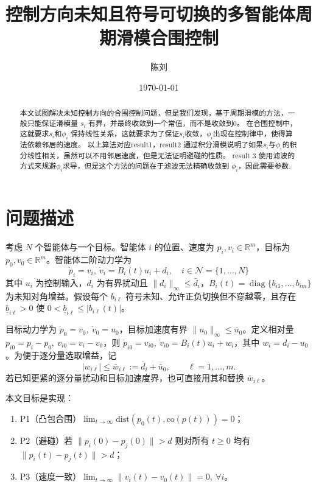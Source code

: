 \documentclass[12pt,a4paper]{article}
\title{控制方向未知且符号可切换的多智能体周期滑模合围控制}
\author{陈\quad 刘}
\date{\today}
\newcommand{\ub}{\underline{b}}
\newcommand{\bd}{\bar{d}}
\newcommand{\bu}{\bar{u}}
\begin{document}
\maketitle


\begin{abstract}
    本文试图解决未知控制方向的合围控制问题，但是我们发现，基于周期滑模的方法，一般只能保证滑模量 ${s}_i$ 有界，并最终收敛到一个常值，而不是收敛到$0$。
    在合围控制中，这就要求$s_i$和$\phi_i$ 保持线性关系，这就要求为了保证$s_i$收敛，$\dot{\phi}_i$出现在控制律中，使得算法依赖邻居的速度。
    以上算法对应result1，result2 通过积分滑模说明了如果${s}_i$与$\phi_i$的积分线性相关，虽然可以不用邻居速度，但是无法证明避碰的性质。
    result 3 使用滤波的方式来规避$\phi_i$求导，但是这个方法的问题在于滤波无法精确收敛到 $\dot{\phi}_i$，因此需要参数.
\end{abstract}

\section{问题描述}

考虑 $N$ 个智能体与一个目标。智能体 $i$ 的位置、速度为 $p_i,v_i\in\mathbb R^m$，目标为 $p_0,v_0\in\mathbb R^m$。智能体二阶动力学为  \[
\dot p_i=v_i,\ \dot v_i=B_i(t)u_i+d_i, \quad i \in \mathcal{N}=\{1,\dots,N\}
\]
其中 $u_i$ 为控制输入，$d_i$ 为有界扰动且 $\|d_i\|_\infty\le\bd_i$，$B_i(t)=\operatorname{diag}\{b_{i1},\dots,b_{im}\}$ 为未知对角增益。假设每个 $b_{i\ell}$ 符号未知、允许正负切换但不穿越零，且存在 $\ub_{i\ell}>0$ 使 $0<\ub_{i\ell}\le|b_{i\ell}(t)|$。

目标动力学为 $\dot p_0=v_0,\ \dot v_0=u_0$，目标加速度有界 $\|u_0\|_\infty\le\bu_0$。定义相对量 $p_{i0}=p_i-p_0,\ v_{i0}=v_i-v_0$，则 $\dot p_{i0}=v_{i0},\ \dot v_{i0}=B_i(t)u_i+w_i$，其中 $w_i=d_i-u_0$。为便于逐分量选取增益，记
\[
    |w_{i\ell}|\le\bar w_{i\ell}:=\bd_i+\bu_0,\qquad \ell=1,\dots,m.
\]
若已知更紧的逐分量扰动和目标加速度界，也可直接用其和替换 $\bar w_{i\ell}$。

本文目标是实现：
\begin{enumerate}
    \item P1（凸包合围）$\lim_{t\to\infty}\mathrm{dist}(p_0(t),\mathrm{co}(p(t)))=0$；
    \item P2（避碰）若 $\|p_i(0)-p_j(0)\|>d$ 则对所有 $t\ge0$ 均有 $\|p_i(t)-p_j(t)\|>d$；
    \item P3（速度一致）$\lim_{t\to\infty}\|v_i(t)-v_0(t)\|=0,\ \forall i$。
\end{enumerate}







\appendix




\end{document}
